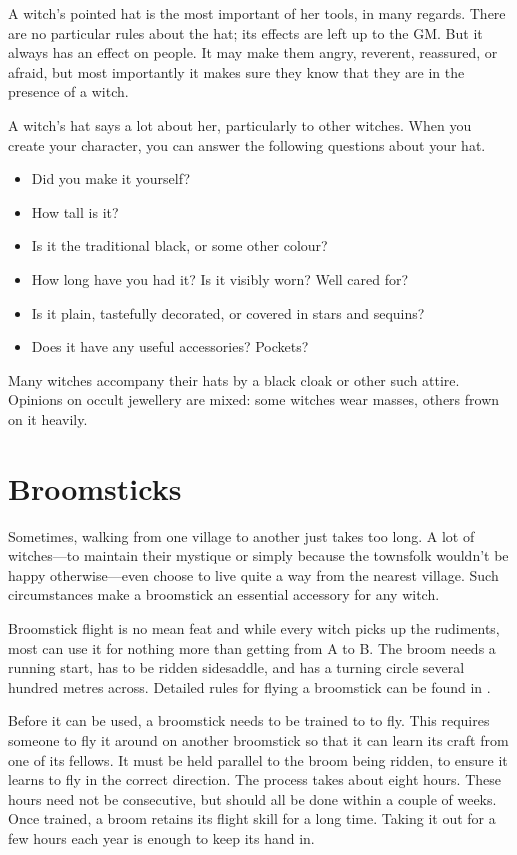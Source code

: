 A witch's pointed hat is the most important of her tools, in many regards.
There are no particular rules about the hat; its effects are left up to the GM.
But it always has an effect on people.
It may make them angry, reverent, reassured, or afraid, but most importantly it makes sure they know that they are in the presence of a witch.

A witch's hat says a lot about her, particularly to other witches.
When you create your character, you can answer the following questions about your hat.

\begin{itemize}
	\item Did you make it yourself?
	\item How tall is it?
	\item Is it the traditional black, or some other colour?
	\item How long have you had it?
		Is it visibly worn?
		Well cared for?
	\item Is it plain, tastefully decorated, or covered in stars and sequins?
	\item Does it have any useful accessories?
		Pockets?
\end{itemize}

Many witches accompany their hats by a black cloak or other such attire.
Opinions on occult jewellery are mixed: some witches wear masses, others frown on it heavily.



\section{Broomsticks}

Sometimes, walking from one village to another just takes too long.
A lot of witches---to maintain their mystique or simply because the townsfolk wouldn't be happy otherwise---even choose to live quite a way from the nearest village.
Such circumstances make a broomstick an essential accessory for any witch.

Broomstick flight is no mean feat and while every witch picks up the rudiments, most can use it for nothing more than getting from A to B.
The broom needs a running start, has to be ridden sidesaddle, and has a turning circle several hundred metres across.
Detailed rules for flying a broomstick can be found in .

Before it can be used, a broomstick needs to be trained to to fly.
This requires someone to fly it around on another broomstick so that it can learn its craft from one of its fellows.
It must be held parallel to the broom being ridden, to ensure it learns to fly in the correct direction.
The process takes about eight hours.
These hours need not be consecutive, but should all be done within a couple of weeks.
Once trained, a broom retains its flight skill for a long time.
Taking it out for a few hours each year is enough to keep its hand in.

